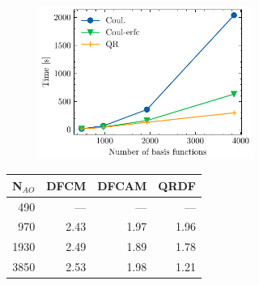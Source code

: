 \begin{figure}[htp]
\begin{subfigure}{\textwidth}
\begin{subfigure}{0.45\textwidth}
\centering
\includegraphics[width=\textwidth]{Pics/hfK1_alkan}
\end{subfigure}
\hfill
\begin{subtable}{0.45\textwidth}
\centering
\begin{tabular}{rrrr}
\hline
N$_{AO}$ & DFCM & DFCAM & QRDF \\ \hline
490 & --- & --- & --- \\ 
970 & 2.43 & 1.97 & 1.96 \\ 
1930 & 2.49 & 1.89 & 1.78 \\ 
3850 & 2.53 & 1.98 & 1.21 \\ \hline
\end{tabular}
\end{subtable}
\caption{}
\label{fig:GS_DFK1SCALE_LA}
\end{subfigure}

\vspace{1.5\baselineskip}


\end{figure}
